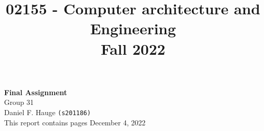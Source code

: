 \documentclass[a4paper]{article}
\begin{document}
\title{02155 - Computer architecture and Engineering\\Fall 2022}
\author{
}
\date{} %
\color{black}
\maketitle

\begin{center}
    { \huge \bfseries Final Assignment}\\
    
    \vspace{1.25cm}
    Group 31\\
    \vspace{.25cm}
    Daniel F. Hauge \texttt{(s201186)}\\
    
    \vspace{6cm}
    This report contains \pageref{LastPage} pages
    \vspace{.25cm}
    \vfill
    December 4, 2022
\end{center}


\medskip
\newpage


\end{document}
